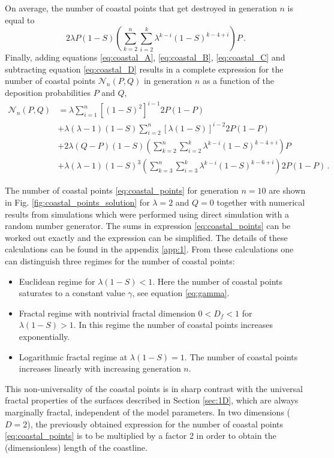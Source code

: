 \documentclass[amsmath,amssymb,amsfonts,aps,pre,preprint,superscriptaddress,bibnotes,showpacs,showkeys,longbibliography,nofootinbib]{revtex4-1}
\begin{document}
On average, the number of coastal points that get destroyed in generation $n$ is equal to 
\begin{equation}
        \label{eq:coastal_D}
         2 \lambda P (1-S)\left(\sum\limits_{k=2}^n \sum\limits_{i=2}^k \lambda^{k-i} (1-S)^{k-4+i}\right)P\, .
\end{equation}
Finally, adding equations \eqref{eq:coastal_A}, \eqref{eq:coastal_B}, \eqref{eq:coastal_C} and subtracting equation \eqref{eq:coastal_D} results in a complete expression for the number of coastal points $\mathcal{N}_n(P,Q)$ in generation $n$ as a function of the deposition probabilities $P$ and $Q$,
\begin{equation}
    \label{eq:coastal_points}
    \begin{split}
        \mathcal{N}_n(P,Q) &= \lambda \sum\limits_{i=1}^n \left[(1-S)^2\right]^{i-1} 2P(1-P)\\
        &+ \lambda(\lambda-1)(1-S) \sum\limits_{i=2}^n \left[\lambda (1-S)\right]^{i-2} 2P (1-P)\\
        &+ 2 \lambda (Q-P) (1-S)\left(\sum\limits_{k=2}^n \sum\limits_{i=2}^k \lambda^{k-i} (1-S)^{k-4+i}\right)P\\
        &+ \lambda (\lambda-1)(1-S)^3 \left(\sum\limits_{k=3}^n \sum\limits_{i=3}^k \lambda^{k-i} (1-S)^{k-6+i}\right)2P(1-P)\, .
    \end{split}
\end{equation}

The number of coastal points \eqref{eq:coastal_points} for generation $n=10$ are shown in Fig. \ref{fig:coastal_points_solution} for $\lambda = 2$ and $Q = 0$ together with numerical results from simulations which were performed using direct simulation with a random number generator. The sums in expression \eqref{eq:coastal_points} can be worked out exactly and the expression can be simplified.  The details of these calculations can be found in the appendix \ref{app:1}. From these calculations one can distinguish three regimes for the number of coastal points:
\begin{itemize}
    \item Euclidean regime for $\lambda(1-S)<1$. Here the number of coastal points saturates to a constant value $\gamma$, see equation \eqref{eq:gamma}. 
    \item Fractal regime with nontrivial fractal dimension $0<D_f<1$ for $\lambda(1-S)>1$. In this regime the number of coastal points increases exponentially. 
    \item Logarithmic fractal regime at $\lambda(1-S)=1$. The number of coastal points increases linearly with increasing generation $n$.
\end{itemize}
This non-universality of the coastal points is in sharp contrast with the universal fractal properties of the surfaces described in Section \ref{sec:1D}, which are always marginally fractal, independent of the model parameters. In two dimensions ($D=2$), the previously obtained expression for the number of coastal points \eqref{eq:coastal_points} is to be multiplied by a factor 2 in order to obtain the (dimensionless) length of the coastline.
\end{document}
